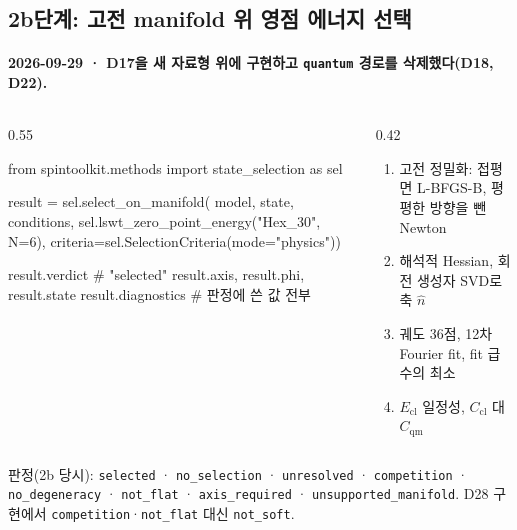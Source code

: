 \subsection{2b단계: 고전 manifold 위 영점 에너지 선택}\label{stage2b-api}
\begingroup%
  \framesubtitle{2026-09-29 · D17을 새 자료형 위에 구현하고 \texttt{quantum} 경로를 삭제했다(D18, D22).}
  \begin{columns}[T,onlytextwidth]
    \begin{column}{0.55\textwidth}
\begin{semiverbatim}\scriptsize
from spintoolkit.methods import state_selection as sel

result = sel.select_on_manifold(
    model, state, conditions,
    sel.lswt_zero_point_energy("Hex_30", N=6),
    criteria=sel.SelectionCriteria(mode="physics"))

result.verdict      # "selected"
result.axis, result.phi, result.state
result.diagnostics  # 판정에 쓴 값 전부
\end{semiverbatim}
    \end{column}
    \begin{column}{0.42\textwidth}
      \small
      \begin{enumerate}\setlength{\itemsep}{0.1em}
        \item 고전 정밀화: 접평면 L-BFGS-B, 평평한 방향을 뺀 Newton
        \item 해석적 Hessian, 회전 생성자 SVD로 축 $\hat n$
        \item 궤도 36점, 12차 Fourier fit, fit 급수의 최소
        \item $E_{\mathrm{cl}}$ 일정성, $C_{\mathrm{cl}}$ 대 $C_{\mathrm{qm}}$
      \end{enumerate}
    \end{column}
  \end{columns}
  \par\medskip
  \small 판정(2b 당시): \texttt{selected} · \texttt{no\_selection} · \texttt{unresolved} · \texttt{competition} · \texttt{no\_degeneracy} · \texttt{not\_flat} · \texttt{axis\_required} · \texttt{unsupported\_manifold}. D28 구현에서 \texttt{competition}·\texttt{not\_flat} 대신 \texttt{not\_soft}.
  \par\medskip
\endgroup


